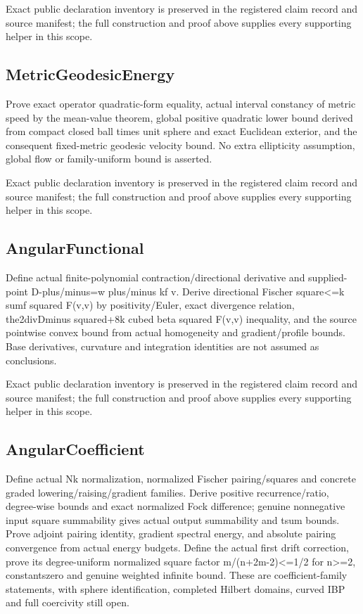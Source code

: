 \documentclass[11pt]{article}
\theoremstyle{definition}
\theoremstyle{remark}
\numberwithin{equation}{section}
\begin{document}
Exact public declaration inventory is preserved in the registered claim record and source manifest; the full construction and proof above supplies every supporting helper in this scope.

\subsection{MetricGeodesicEnergy}
\label{daytime-v010:metricgeodesicenergy}
Prove exact operator quadratic-form equality, actual interval constancy of metric speed by the mean-value theorem, global positive quadratic lower bound derived from compact closed ball times unit sphere and exact Euclidean exterior, and the consequent fixed-metric geodesic velocity bound. No extra ellipticity assumption, global flow or family-uniform bound is asserted.

Exact public declaration inventory is preserved in the registered claim record and source manifest; the full construction and proof above supplies every supporting helper in this scope.

\subsection{AngularFunctional}
\label{daytime-v010:angularfunctional}
Define actual finite-polynomial contraction/directional derivative and supplied-point D-plus/minus=w plus/minus kf v. Derive directional Fischer square<=k sumf squared F(v,v) by positivity/Euler, exact divergence relation, the2divDminus squared+8k cubed beta squared F(v,v) inequality, and the source pointwise convex bound from actual homogeneity and gradient/profile bounds. Base derivatives, curvature and integration identities are not assumed as conclusions.

Exact public declaration inventory is preserved in the registered claim record and source manifest; the full construction and proof above supplies every supporting helper in this scope.

\subsection{AngularCoefficient}
\label{daytime-v010:angularcoefficient}
Define actual Nk normalization, normalized Fischer pairing/squares and concrete graded lowering/raising/gradient families. Derive positive recurrence/ratio, degree-wise bounds and exact normalized Fock difference; genuine nonnegative input square summability gives actual output summability and tsum bounds. Prove adjoint pairing identity, gradient spectral energy, and absolute pairing convergence from actual energy budgets. Define the actual first drift correction, prove its degree-uniform normalized square factor m/(n+2m-2)<=1/2 for n>=2, constantszero and genuine weighted infinite bound. These are coefficient-family statements, with sphere identification, completed Hilbert domains, curved IBP and full coercivity still open.
\end{document}
